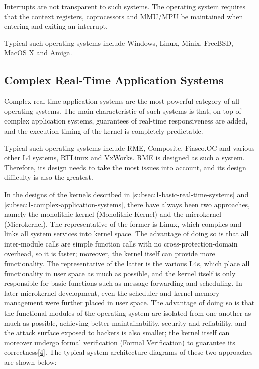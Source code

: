 Interrupts are not transparent to such systems. The operating system requires that the context registers, coprocessors and MMU/MPU be maintained when entering and exiting an interrupt.

Typical such operating systems include Windows, Linux, Minix, FreeBSD, MacOS X and Amiga.

\subsection{Complex Real-Time Application Systems}\label{subsec:1-complex-real-time-application-systems}

Complex real-time application systems are the most powerful category of all operating systems. The main characteristic of such systems is that, on top of complex application systems, guarantees of real-time responsiveness are added, and the execution timing of the kernel is completely predictable.

Typical such operating systems include RME, Composite, Fiasco.OC and various other L4 systems, RTLinux and VxWorks. RME is designed as such a system. Therefore, its design needs to take the most issues into account, and its design difficulty is also the greatest.

In the designs of the kernels described in \ref{subsec:1-basic-real-time-systems} and \ref{subsec:1-complex-application-systems}, there have always been two approaches, namely the monolithic kernel (Monolithic Kernel) and the microkernel (Microkernel). The representative of the former is Linux, which compiles and links all system services into kernel space. The advantage of doing so is that all inter-module calls are simple function calls with no cross-protection-domain overhead, so it is faster; moreover, the kernel itself can provide more functionality. The representative of the latter is the various L4s, which place all functionality in user space as much as possible, and the kernel itself is only responsible for basic functions such as message forwarding and scheduling. In later microkernel development, even the scheduler and kernel memory management were further placed in user space. The advantage of doing so is that the functional modules of the operating system are isolated from one another as much as possible, achieving better maintainability, security and reliability, and the attack surface exposed to hackers is also smaller; the kernel itself can moreover undergo formal verification (Formal Verification) to guarantee its correctness\hyperref[cite:1-4]{{[}4{]}}. The typical system architecture diagrams of these two approaches are shown below:

